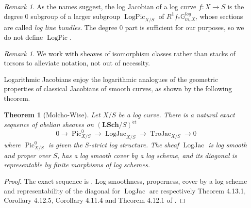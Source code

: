\documentclass[a4paper,11pt]{amsart} %
\numberwithin{equation}{subsection}
\newcommand{\on}[1]{\operatorname{#1}}
\newcommand{\bb}[1]{{\mathbb{#1}}}
\newcommand{\bd}[1]{{\mathbf{#1}}}
\newcommand{\cat}[1]{\bd{#1}}
\def\et{\mathrm{\acute{e}t}}
\def\Trojac{\operatorname{TroJac}}
\def\Logjac{\operatorname{LogJac}}
\def\Pic{\operatorname{Pic}}
\theoremstyle{definition}
\theoremstyle{plain}%
\newtheorem{theorem}[definition]{Theorem}
\theoremstyle{remark}
\newtheorem{remark}[definition]{Remark}
\begin{document}
\begin{remark}
    As the names suggest, the log Jacobian of a log curve $f \colon X \to S$ is the degree $0$ subgroup of a larger subgroup $\on{LogPic}_{X/S}$ of $R^1f_*\bb G_{m,X}^{log}$, whose sections are called \emph{log line bundles}. The degree $0$ part is sufficient for our purposes, so we do not define $\on{LogPic}$.
\end{remark}

\begin{remark}
     We work with sheaves of isomorphism classes rather than stacks of torsors to alleviate notation, not out of necessity.
\end{remark}

Logarithmic Jacobians enjoy the logarithmic analogues of the geometric properties of classical Jacobians of smooth curves, as shown by the following theorem.

\begin{theorem}[Molcho-Wise]\label{theorem:representability_and_properties_logjac}
    Let $X/S$ be a log curve. There is a natural exact sequence of abelian sheaves on $(\cat{LSch}/S)^{\et}$
    \begin{equation}\label{ExactLogPic}
        0 \to \Pic^0_{X/S} \to \Logjac_{X/S} \to \Trojac_{X/S} \to 0
    \end{equation}
    where $\Pic^{0}_{X/S}$ is given the $S$-strict log structure. The sheaf $\Logjac$ is log smooth and proper over $S$, has a log smooth cover by a log scheme, and its diagonal is representable by finite morphisms of log schemes. %
\end{theorem}

\begin{proof}
    The exact sequence is \cite[Theorem 4.14.6]{molcho_wise_2022}. Log smoothness, properness, cover by a log scheme and representability of the diagonal for $\Logjac$ are respectively Theorem 4.13.1, Corollary 4.12.5, Corollary 4.11.4 and Theorem 4.12.1 of \cite{molcho_wise_2022}.
\end{proof}
\end{document}
